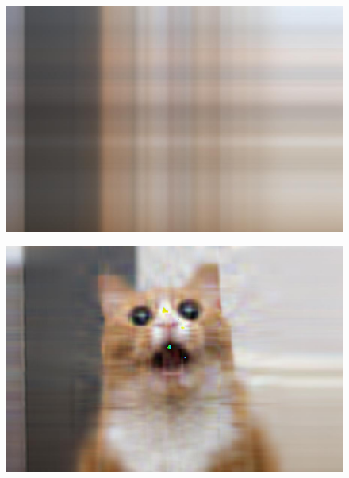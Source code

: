 \begin{sol}
\begin{figure}[h]
    \begin{minipage}[t]{.24\textwidth}
        \centering
        \includegraphics[width=1.1\textwidth]{1.jpg}
        \label{fig:p1}
    \end{minipage}
    \hfill
    \begin{minipage}[t]{.24\textwidth}
        \centering
        \includegraphics[width=1.1\textwidth]{11.jpg}
        \label{fig:p11}
    \end{minipage}  
    

\end{figure}
\end{sol}
